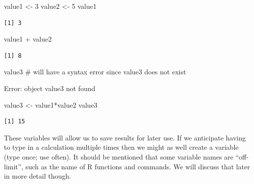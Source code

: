 \documentclass[
  letterpaper,
  DIV=11,
  numbers=noendperiod]{scrreprt}
\newenvironment{Shaded}{\begin{snugshade}}{\end{snugshade}}
\newcommand{\CommentTok}[1]{\textcolor[rgb]{0.37,0.37,0.37}{#1}}
\newcommand{\DecValTok}[1]{\textcolor[rgb]{0.68,0.00,0.00}{#1}}
\newcommand{\NormalTok}[1]{\textcolor[rgb]{0.00,0.23,0.31}{#1}}
\newcommand{\OtherTok}[1]{\textcolor[rgb]{0.00,0.23,0.31}{#1}}
\newcommand{\SpecialCharTok}[1]{\textcolor[rgb]{0.37,0.37,0.37}{#1}}
\begin{document}
\begin{Shaded}
\begin{Highlighting}[]
\NormalTok{value1 }\OtherTok{\textless{}{-}} \DecValTok{3}
\NormalTok{value2 }\OtherTok{\textless{}{-}} \DecValTok{5}
\NormalTok{value1}
\end{Highlighting}
\end{Shaded}

\begin{verbatim}
[1] 3
\end{verbatim}

\begin{Shaded}
\begin{Highlighting}[]
\NormalTok{value1 }\SpecialCharTok{+}\NormalTok{ value2}
\end{Highlighting}
\end{Shaded}

\begin{verbatim}
[1] 8
\end{verbatim}

\begin{Shaded}
\begin{Highlighting}[]
\NormalTok{value3 }\CommentTok{\# will have a syntax error since value3 does not exist}
\end{Highlighting}
\end{Shaded}

{Error: object \textquotesingle value3\textquotesingle{} not found}

\begin{Shaded}
\begin{Highlighting}[]
\NormalTok{value3 }\OtherTok{\textless{}{-}}\NormalTok{ value1}\SpecialCharTok{*}\NormalTok{value2}
\NormalTok{value3}
\end{Highlighting}
\end{Shaded}

\begin{verbatim}
[1] 15
\end{verbatim}

These variables will allow us to save results for later use. If we
anticipate having to type in a calculation multiple times then we might
as well create a variable (type once; use often). It should be mentioned
that some variable names are ``off-limit'', such as the name of R
functions and commands. We will discuss that later in more detail
though.
\end{document}
